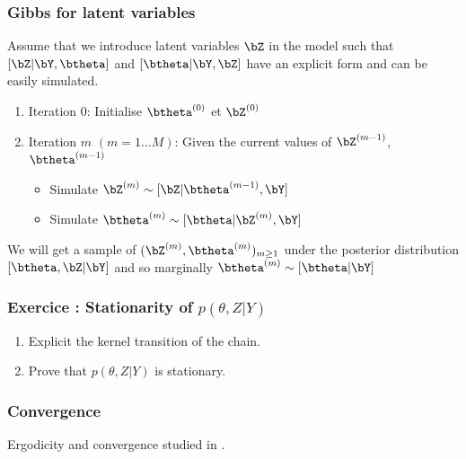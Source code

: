 \begin{frame}\frametitle{Gibbs for latent variables}  
Assume that we introduce latent variables $\bZ$ in the model such that   $[\bZ | \bY, \btheta]$ and  $[\btheta | \bY, \bZ]$  have an explicit form and can be easily simulated. 

\begin{block}{}
\begin{enumerate}
\item[] \vert Iteration 0:  \noir Initialise $\btheta^{(0)}$  et $\bZ^{(0)}$
\item[] \vert Iteration $m$ $(m=1\dots M)$: \noir  Given the current values of $\bZ^{(m-1)}$, $\btheta^{(m-1)}$
\begin{itemize}
\item Simulate $\bZ^{(m)} \sim [\bZ| \btheta^{(m-1)}, \bY]$
\item Simulate  $\btheta^{(m)} \sim [\btheta | \bZ^{(m)}, \bY]$
\end{itemize}
\end{enumerate}
\end{block}
We will get a sample of $(\bZ^{(m)}, \btheta^{(m)})_{m \geq 1}$ under the posterior distribution  $[\btheta, \bZ  | \bY]$ and so marginally $\btheta^{(m)} \sim [\btheta | \bY]$

\end{frame}

\begin{frame}\frametitle{Exercice : Stationarity of $p(\theta,Z | Y)$}  
\begin{enumerate}
 \item Explicit the kernel transition of the chain. 
 \item Prove that $p(\theta,Z | Y)$ is stationary.  
\end{enumerate}
\end{frame}

\begin{frame}\frametitle{Convergence}  
Ergodicity  and convergence studied in \cite{robert1999monte}.    

\end{frame}


